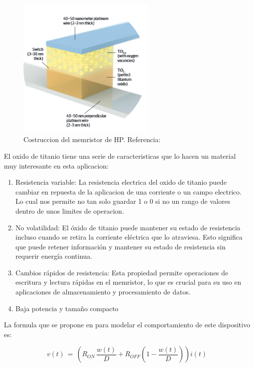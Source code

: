 \documentclass[12pt,a4paper]{report} %
\begin{document}
	\begin{figure}[h]
		\centering
		\includegraphics[width=0.6\textwidth]{mem1.png}
		\caption{Costruccion del memristor de HP. Referencia: \cite{williams}}
		\label{fig:mem1}
	\end{figure}
	
	El oxido de titanio tiene una serie de caracteristicas que lo hacen un material muy interesante en esta aplicacion:
	\begin{enumerate}
		\item Resistencia variable: La resistencia electrica del oxido de titanio puede cambiar en repuesta de la aplicacion de una corriente o un campo electrico. Lo cual nos permite no tan solo guardar 1 o 0 si no un rango de valores dentro de unos limites de operacion.
		\item No volatilidad: El óxido de titanio puede mantener su estado de resistencia incluso cuando se retira la corriente eléctrica que lo atraviesa. Esto significa que puede retener información y mantener su estado de resistencia sin requerir energía continua.
		\item Cambios rápidos de resistencia:  Esta propiedad permite operaciones de escritura y lectura rápidas en el memristor, lo que es crucial para su uso en aplicaciones de almacenamiento y procesamiento de datos.
		\item Baja potencia y tamaño compacto
	\end{enumerate}
	\newpage
	
	La formula que se propone en \cite{HP} para modelar el comportamiento de este dispositivo es:
	
	\begin{equation}
		v(t)\,=\,\left(R_{ON}\,\frac{w(t)}{D}+R_{OFF}\left(1-\frac{w(t)}{D}\right)\right)i(t)
		\label{eq:hp1}
	\end{equation}
	
\end{document}
